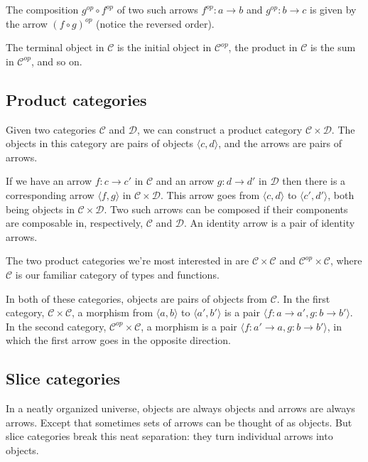 \documentclass[DaoFP]{subfiles}
\begin{document}
The composition $g^{op} \circ f^{op}$ of two such arrows $f^{op} \colon a \to b$ and $g^{op} \colon b \to c$ is given by the arrow $(f \circ g)^{op}$ (notice the reversed order).

The terminal object in  $\mathcal{C}$ is the initial object in $\mathcal{C}^{op}$, the product in  $\mathcal{C}$ is the sum in $\mathcal{C}^{op}$, and so on. 

\subsection{Product categories}

Given two categories $\mathcal{C}$ and $\mathcal{D}$, we can construct a product category $\mathcal{C} \times \mathcal{D}$. The objects in this category are pairs of objects $\langle c, d \rangle $, and the arrows are pairs of arrows. 

If we have an arrow $f \colon c \to c'$ in $\mathcal{C}$ and an arrow $g \colon d \to d'$ in $\mathcal{D}$ then there is a corresponding arrow $\langle f, g \rangle$ in $\mathcal{C} \times \mathcal{D}$.  This arrow goes from $\langle c, d \rangle $ to $\langle c', d' \rangle $, both being objects in $\mathcal{C} \times \mathcal{D}$. Two such arrows can be composed if their components are composable in, respectively, $\mathcal{C}$ and $\mathcal{D}$. An identity arrow is a pair of identity arrows.

The two product categories we're most interested in are $\mathcal{C} \times \mathcal{C}$ and $\mathcal{C}^{op} \times \mathcal{C}$, where $\mathcal{C}$ is our familiar category of types and functions.

In both of these categories, objects are pairs of objects from $\mathcal{C}$. In the first category, $\mathcal{C} \times \mathcal{C}$, a morphism from $\langle a, b \rangle $ to $\langle a', b' \rangle $ is a pair $\langle f \colon a \to a', g \colon b \to b' \rangle $. In the second category, $\mathcal{C}^{op} \times \mathcal{C}$, a morphism is a pair $\langle f \colon a' \to a, g \colon b \to b' \rangle $, in which the first arrow goes in the opposite direction.

\subsection{Slice categories}

In a neatly organized universe, objects are always objects and arrows are always arrows. Except that sometimes sets of arrows can be thought of as objects. But slice categories break this neat separation: they turn individual arrows into objects. 
\end{document}
